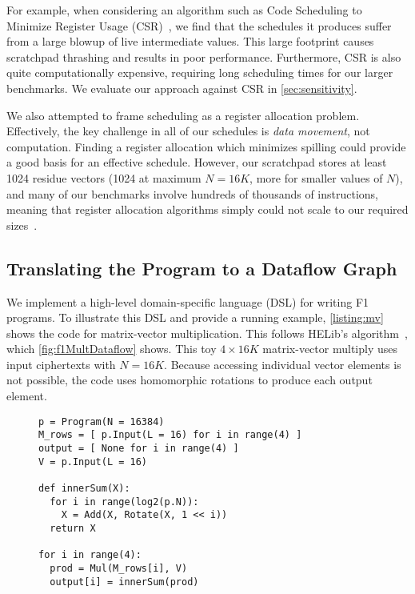 For example, when considering an algorithm such as Code Scheduling to Minimize
Register Usage (CSR)~\cite{goodman:ics1988:code}, we find that the schedules it
produces suffer from a large blowup of live intermediate values. This large
footprint causes scratchpad thrashing and results in poor performance.
Furthermore, CSR is also quite computationally expensive, requiring long
scheduling times for our larger benchmarks. We evaluate our approach against
CSR in \autoref{sec:sensitivity}.

We also attempted to frame scheduling as a register allocation problem.
Effectively, the key challenge in all of our schedules is \emph{data movement},
not computation. Finding a register allocation which minimizes spilling could
provide a good basis for an effective schedule. However, our scratchpad stores
at least 1024 residue vectors (1024 at maximum $N = 16K$, more for smaller
values of $N$), and many of our benchmarks involve hundreds of thousands of
instructions, meaning that register allocation algorithms simply could not
scale to our required sizes~\cite{barany:odes2011:register,
xu:sigplan2007:tetris, touati:ijpp2005:register, berson:pact1993:ursa}.

\subsection{Translating the Program to a Dataflow Graph}
\label{sec:programming}

We implement a high-level domain-specific language (DSL) for writing F1
programs. To illustrate this DSL and provide a running example,
\autoref{listing:mv} shows the code for matrix-vector multiplication. This
follows HELib's algorithm~\cite{halevi:crypto14:algorithms}, which
\autoref{fig:f1MultDataflow} shows. This toy $4 \times 16K$ matrix-vector
multiply uses input ciphertexts with $N=16K$. Because accessing individual
vector elements is not possible, the code uses homomorphic rotations to produce
each output element.

\figFOneMultDataflow

\begin{figure}
\begin{center}
  \begin{lstlisting}[caption={$(4 \times 16K)$ matrix-vector multiply in F1's DSL.}, mathescape=true, style=custompython, label=listing:mv]
p = Program(N = 16384)
M_rows = [ p.Input(L = 16) for i in range(4) ]
output = [ None for i in range(4) ]
V = p.Input(L = 16)

def innerSum(X):
  for i in range(log2(p.N)):
    X = Add(X, Rotate(X, 1 << i))
  return X

for i in range(4):
  prod = Mul(M_rows[i], V)
  output[i] = innerSum(prod)
  \end{lstlisting}
\end{center}
\vspace{0.15cm}
\end{figure}


